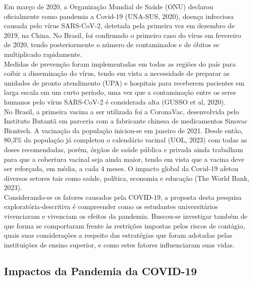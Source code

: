 \documentclass[
]{article}
\begin{document}
Em março de 2020, a Organização Mundial de Saúde (ONU) declarou
oficialmente como pandemia a Covid-19 (UNA-SUS, 2020), doença infecciosa
causada pelo vírus SARS-CoV-2, detetada pela primeira vez em dezembro de
2019, na China. No Brasil, foi confirmado o primeiro caso do vírus em
fevereiro de 2020, tendo posteriormente o número de contaminados e de
óbitos se multiplicado rapidamente.\\
Medidas de prevenção foram implementadas em todas as regiões do país
para coibir a disseminação do vírus, tendo em vista a necessidade de
preparar as unidades de pronto atendimento (UPA) e hospitais para
receberem pacientes em larga escala em um curto período, uma vez que a
contaminação entre os seres humanos pelo vírus SARS-CoV-2 é considerada
alta (GUSSO et al, 2020).\\
No Brasil, a primeira vacina a ser utilizada foi a CoronaVac,
desenvolvida pelo Instituto Butantã em parceria com a fabricante chinesa
de medicamentos Sinovac Biontech. A vacinação da população iniciou-se em
janeiro de 2021. Desde então, 80,3\% da população já completou o
calendário vacinal (UOL, 2023) com todas as doses recomendadas, porém,
órgãos de saúde pública e privada ainda trabalham para que a cobertura
vacinal seja ainda maior, tendo em vista que a vacina deve ser
reforçada, em média, a cada 4 meses. O impacto global da Covid-19 afetou
diversos setores tais como saúde, política, economia e educação (The
World Bank, 2023).\\
Considerando-se os fatores causados pela COVID-19, a proposta desta
pesquisa exploratória-descritiva é compreender como os estudantes
universitários vivenciaram e vivenciam os efeitos da pandemia. Buscou-se
investigar também de que forma se comportaram frente às restrições
impostas pelos riscos de contágio, quais suas considerações a respeito
das estratégias que foram adotadas pelas instituições de ensino
superior, e como estes fatores influenciaram suas vidas.

\hypertarget{impactos-da-pandemia-da-covid-19}{%
\subsection{Impactos da Pandemia da
COVID-19}\label{impactos-da-pandemia-da-covid-19}}
\end{document}
